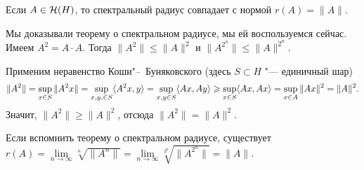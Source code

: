 \begin{Ut}
 Если $A\in\mathcal H(H)$, то спектральный радиус совпадает с нормой $r(A) = \|A\|$.
\end{Ut}
\begin{Proof}
Мы доказывали теорему о спектральном радиусе, мы ей воспользуемся сейчас. Имеем $A^2 = A\cdot A$. Тогда
$ \|A^2\|\le \|A\|^2$ и $\|A^{2^n}\|\le \|A\|^{2^n}$.

Применим неравенство Коши"--~Буняковского (здесь $S\subset H$ "--- единичный шар)
\[
\|A^2\| = \sup\limits_{x\in S}\|A^2 x\| = \sup\limits_{x,y,\in S}\langle A^2 x,y\rangle = \sup\limits_{x,y\in S}\langle Ax,Ay\rangle\geqslant
  \sup\limits_{x\in S}\langle Ax,Ax\rangle = \sup\limits_{x\in A} \|Ax\|^2 = \|A\|^2.
\]
Значит, $\|A^2\|\ge \|A\|^2$, отсюда $\|A^2\| = \|A\|^2$. 

Если вспомнить теорему о спектральном радиусе, существует $r(A) = \lim\limits_{n\to\infty} \sqrt[n] {\|A^n\|} = \lim\limits_{n\to\infty} \sqrt[2^n]{\|A^{2^n}\|} = \|A\|$.
\end{Proof}

